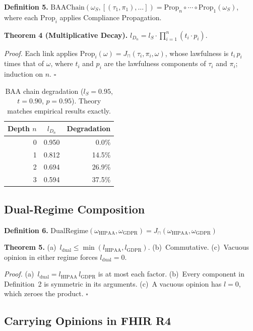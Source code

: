 \documentclass[conference]{IEEEtran}
\begin{document}
\textbf{Definition 5.} $\text{BAAChain}(\omega_S, [(\tau_1, \pi_1), \ldots]) = \text{Prop}_n \circ \cdots \circ \text{Prop}_1(\omega_S)$, where each $\text{Prop}_i$ applies Compliance Propagation.

\textbf{Theorem 4 (Multiplicative Decay).} $l_{D_n} = l_S \cdot \prod_{i=1}^{n} (t_i \cdot p_i)$.

\emph{Proof.} Each link applies $\text{Prop}_i(\omega) = J_\sqcap(\tau_i, \pi_i, \omega)$, whose lawfulness is $t_i \, p_i$ times that of $\omega$, where $t_i$ and $p_i$ are the lawfulness components of $\tau_i$ and $\pi_i$; induction on $n$. $\square$

\begin{table}[t]
\centering
\caption{BAA chain degradation ($l_S = 0.95$, $t = 0.90$, $p = 0.95$). Theory matches empirical results exactly.}
\label{tab:baa_decay}
\footnotesize
\begin{tabular}{@{}rcr@{}}
\toprule
Depth $n$ & $l_{D_n}$ & Degradation \\
\midrule
0 & 0.950 & 0.0\% \\
1 & 0.812 & 14.5\% \\
2 & 0.694 & 26.9\% \\
3 & 0.594 & 37.5\% \\
\bottomrule
\end{tabular}
\end{table}

\subsection{Dual-Regime Composition}

\textbf{Definition 6.} $\text{DualRegime}(\omega_{\text{HIPAA}}, \omega_{\text{GDPR}}) = J_\sqcap(\omega_{\text{HIPAA}}, \omega_{\text{GDPR}})$

\textbf{Theorem 5.} (a)~$l_{\text{dual}} \leq \min(l_{\text{HIPAA}}, l_{\text{GDPR}})$. (b)~Commutative. (c)~Vacuous opinion in either regime forces $l_{\text{dual}} = 0$.

\emph{Proof.} (a)~$l_{\text{dual}} = l_{\text{HIPAA}} \, l_{\text{GDPR}}$ is at most each factor. (b)~Every component in Definition~2 is symmetric in its arguments. (c)~A vacuous opinion has $l = 0$, which zeroes the product. $\square$



\subsection{Carrying Opinions in FHIR R4}
\end{document}
